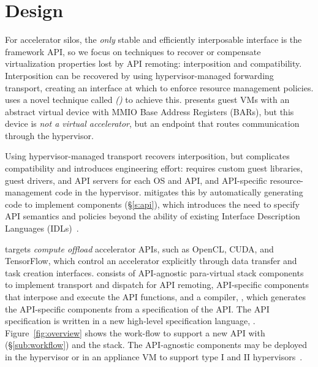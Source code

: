 
\graphicspath{{images/}}

\section{Design}
\label{s:design}
\label{s:motivation}

For accelerator silos, the \emph{only} stable and
efficiently interposable interface is the framework API, so
we focus on techniques to recover or compensate virtualization properties lost by
API remoting: interposition and compatibility.
Interposition can be recovered by using hypervisor-managed forwarding transport,
creating an interface at which to enforce resource management policies.
\Model uses a novel technique called \emph{\noveltechnique (\novtechabbrv)} to achieve this.
\novtechabbrv presents guest VMs with an abstract virtual device with MMIO Base Address Registers (BARs), but this device is \emph{not a virtual accelerator}, but an endpoint that
routes communication through the hypervisor.

Using hypervisor-managed transport recovers interposition, but complicates compatibility and introduces engineering effort:
\novtechabbrv requires custom guest libraries, guest drivers, and API servers for each OS and API, and API-specific resource-management code in the hypervisor.
\model mitigates this by
automatically generating code to implement \novtechabbrv components (\S\ref{s:api}), which introduces the
need to specify API semantics and policies beyond the ability of existing Interface Description Languages (IDLs)~\cite{Lamb1987,MSIDL}.

\Model targets \emph{compute offload} accelerator APIs,
such as OpenCL, CUDA, and TensorFlow, which control an accelerator explicitly
through data transfer and task creation interfaces.
\Model consists of API-agnostic para-virtual stack components to
implement transport and dispatch for API remoting,
API-specific components that interpose and execute the API functions,
and a compiler, \compiler, which generates the API-specific components from a
specification of the API.
The API specification is written in a new high-level specification language, \speclang.
Figure~\ref{fig:overview} shows the work-flow to support a new API with \model (\S\ref{sub:workflow}) and the \model stack.
The API-agnostic components may be deployed in the hypervisor or in an appliance VM to support type I and II hypervisors~\cite{Popek1974-xx}.

